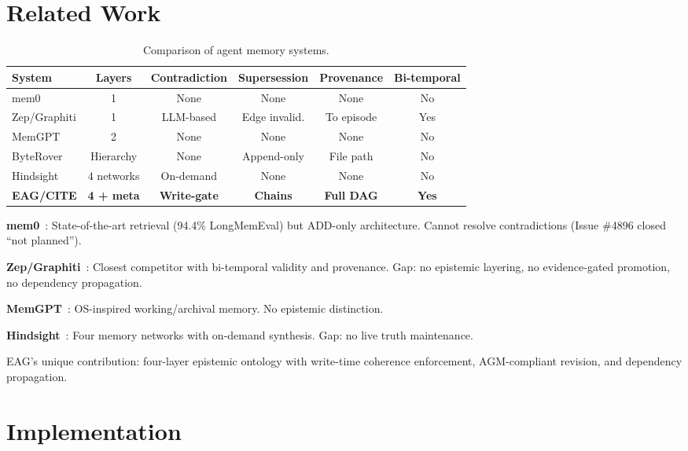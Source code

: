 \documentclass[11pt,a4paper]{article}
\begin{document}
\section{Related Work}

\begin{table}[H]
\centering
\caption{Comparison of agent memory systems.}
\label{tab:comparison}
\begin{tabular}{@{}lccccc@{}}
\toprule
\textbf{System} & \textbf{Layers} & \textbf{Contradiction} & \textbf{Supersession} & \textbf{Provenance} & \textbf{Bi-temporal} \\
\midrule
mem0 & 1 & None & None & None & No \\
Zep/Graphiti & 1 & LLM-based & Edge invalid. & To episode & Yes \\
MemGPT & 2 & None & None & None & No \\
ByteRover & Hierarchy & None & Append-only & File path & No \\
Hindsight & 4 networks & On-demand & None & None & No \\
\textbf{EAG/CITE} & \textbf{4 + meta} & \textbf{Write-gate} & \textbf{Chains} & \textbf{Full DAG} & \textbf{Yes} \\
\bottomrule
\end{tabular}
\end{table}

\textbf{mem0}~\cite{mem0}: State-of-the-art retrieval (94.4\% LongMemEval) but ADD-only architecture. Cannot resolve contradictions (Issue \#4896 closed ``not planned'').

\textbf{Zep/Graphiti}~\cite{graphiti2025}: Closest competitor with bi-temporal validity and provenance. Gap: no epistemic layering, no evidence-gated promotion, no dependency propagation.

\textbf{MemGPT}~\cite{memgpt2023}: OS-inspired working/archival memory. No epistemic distinction.

\textbf{Hindsight}~\cite{hindsight}: Four memory networks with on-demand synthesis. Gap: no live truth maintenance.

EAG's unique contribution: four-layer epistemic ontology with write-time coherence enforcement, AGM-compliant revision, and dependency propagation.

\section{Implementation}
\end{document}
